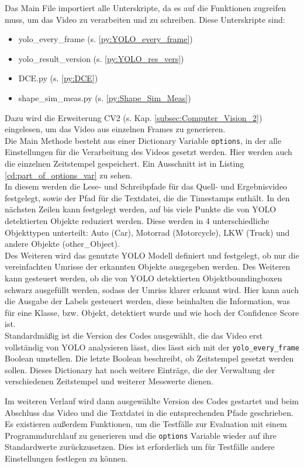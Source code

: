 { 
	Das Main File importiert alle Unterskripte, da es auf die Funktionen zugreifen muss, um das Video zu verarbeiten und zu schreiben. Diese Unterskripte sind: 
	\begin{itemize}
		\item yolo\_every\_frame (s. \ref{py:YOLO_every_frame})
		\item yolo\_result\_version (s. \ref{py:YOLO_res_vers})
		\item DCE.py (s. \ref{py:DCE})
		\item shape\_sim\_meas.py (s. \ref{py:Shape_Sim_Meas})
	\end{itemize}
	Dazu wird die Erweiterung CV2 (s. Kap. \ref{subsec:Computer_Vision_2}) eingelesen, um das Video aus einzelnen Frames zu generieren.\\
	Die Main Methode besteht aus einer Dictionary Variable \lstinline|options|, in der alle Einstellungen für die Verarbeitung des Videos gesetzt werden. Hier werden auch die einzelnen Zeitstempel gespeichert. \ifimportant Ein Ausschnitt ist in Listing \ref{cd:part_of_options_var} zu sehen. \fi \\
	In diesem werden die Lese- und Schreibpfade für das Quell- und Ergebnisvideo festgelegt, sowie der Pfad für die Textdatei, die die Timestamps enthält. In den nächsten Zeilen kann festgelegt werden, auf bis viele Punkte die von YOLO detektierten Objekte reduziert werden. Diese werden in 4 unterschiedliche Objekttypen unterteilt: Auto (Car), Motorrad (Motorcycle), LKW (Truck) und andere Objekte (other\_Object). \\
	Des Weiteren wird das genutzte YOLO Modell definiert und festgelegt, ob nur die vereinfachten Umrisse der erkannten Objekte ausgegeben werden. Des Weiteren kann gesteuert werden, ob die von YOLO detektierten Objektboundingboxen schwarz ausgefüllt werden, sodass der Umriss klarer erkannt wird. Hier kann auch die Ausgabe der Labels gesteuert werden, diese beinhalten die Information, was für eine Klasse, bzw. Objekt, detektiert wurde und wie hoch der Confidence Score ist. \\
	Standardmäßig ist die Version des Codes ausgewählt, die das Video erst vollständig von YOLO analysieren lässt, dies lässt sich mit der \lstinline|yolo_every_frame| Boolean umstellen. Die letzte Boolean beschreibt, ob Zeitstempel gesetzt werden sollen. Dieses Dictionary hat noch weitere Einträge, die der Verwaltung der verschiedenen Zeitstempel und weiterer Messwerte dienen. \\
	\ifimportant
	
	\fi	Im weiteren Verlauf wird dann ausgewählte Version des Codes gestartet und beim Abschluss das Video und die Textdatei in die entsprechenden Pfade geschrieben.
	Es existieren außerdem Funktionen, um die Testfälle zur Evaluation mit einem Programmdurchlauf zu generieren und die \lstinline|options| Variable wieder auf ihre Standardwerte zurückzusetzen. Dies ist erforderlich um für Testfälle andere Einstellungen festlegen zu können.
}



